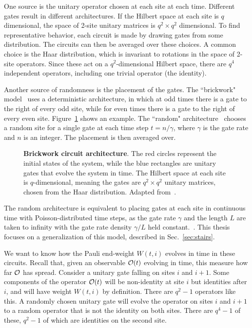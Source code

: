 One source is the unitary operator chosen at each site at each time. Different gates result in different architectures. 
If the Hilbert space at each site is $q$ dimensional, the space of 2-site unitary matrices is $q^2\times q^2$ dimensional. To find representative behavior, each circuit is made by drawing gates from some distribution. The circuits can then be averaged over these choices. A common choice is the Haar distribution, which is invariant to rotations in the space of 2-site operators. Since these act on a $q^2$-dimensional Hilbert space, there are $q^4$ independent operators, including one trivial operator (the identity). 

Another source of randomness is the placement of the gates. The ``brickwork" model~\cite{Keyserlingk} uses a deterministic architecture, in which at odd times there is a gate to the right of every odd site, while for even times there is a gate to the right of every even site. Figure~\ref{fig:brickcircuit} shows an example. The ``random" architecture~\cite{Nahum2017} chooses a random site for a single gate at each time step $t = n/\gamma$, where $\gamma$ is the gate rate and $n$ is an integer. The placement is then averaged over. 

\begin{figure}
	\centering
	
	\caption{\textbf{Brickwork circuit architecture}. The red circles represent the initial states of the system, while the blue rectangles are unitary gates that evolve the system in time. The Hilbert space at each site is $q$-dimensional, meaning the gates are $q^2\times q^2$ unitary  matrices, chosen from the Haar distribution. Adapted from~\cite{Keyserlingk}.}
	\label{fig:brickcircuit}
\end{figure}

The random architecture is equivalent to placing gates at each site in continuous time with Poisson-distributed time steps, as the gate rate $\gamma$ and the length $L$ are taken to infinity with the gate rate density $\gamma/L$ held constant.~\cite{Nahum2017}. This thesis focuses on a generalization of this model, described in Sec.~\ref{sec:stairs}.


We want to know how the Pauli end-weight $W(t,i)$ evolves in time in these circuits. Recall that, given an observable $\cal{O}(t)$ evolving in time, this measure how far $\cal{O}$ has spread. Consider a unitary gate falling on sites $i$ and $i+1$. Some components of the operator $\cal{O}(t)$ will be non-identity at site $i$ but identities after $i$, and will have weight $W(t, i)$ by definition. There are $q^2-1$ operators like this. A randomly chosen unitary gate will evolve the operator on sites $i$ and $i+1$ to a random operator that is not the identity on both sites. There are $q^4-1$ of these, $q^2-1$ of which are identities on the second site.


